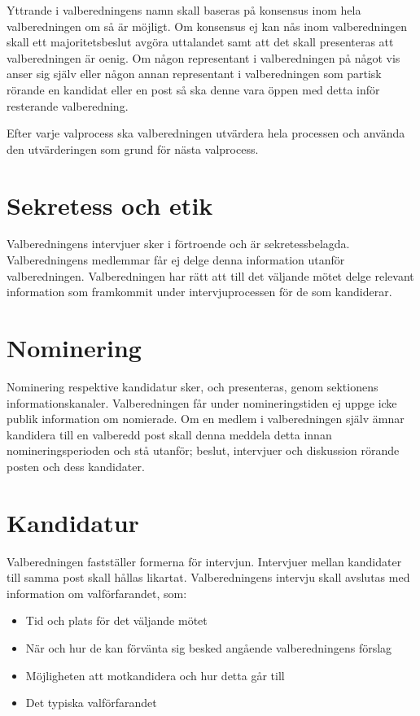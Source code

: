 \documentclass{dsekprotokoll}
\begin{document}
Yttrande i valberedningens namn skall baseras på konsensus inom hela valberedningen om
så är möjligt. Om konsensus ej kan nås inom valberedningen skall ett majoritetsbeslut avgöra
uttalandet samt att det skall presenteras att valberedningen är oenig.
Om någon representant i valberedningen på något vis anser sig själv eller någon annan representant i valberedningen som partisk rörande en kandidat eller en post så ska denne vara
öppen med detta inför resterande valberedning.


Efter varje valprocess ska valberedningen utvärdera hela processen och använda den utvärderingen som grund för nästa valprocess.

\section{Sekretess och etik}
Valberedningens intervjuer sker i förtroende och är sekretessbelagda. Valberedningens medlemmar får ej delge denna information utanför valberedningen. Valberedningen har rätt att till
det väljande mötet delge relevant information som framkommit under intervjuprocessen för
de som kandiderar.

\section{Nominering}
Nominering respektive kandidatur sker, och presenteras, genom sektionens informationskanaler. Valberedningen får under nomineringstiden ej uppge icke publik information om nomierade. Om en medlem i valberedningen själv ämnar kandidera till en valberedd post skall
denna meddela detta innan nomineringsperioden och stå utanför; beslut, intervjuer och diskussion rörande posten och dess kandidater.

\section{Kandidatur}
Valberedningen fastställer formerna för intervjun. Intervjuer mellan kandidater till samma post
skall hållas likartat. Valberedningens intervju skall avslutas med information om valförfarandet, som:
\begin{itemize}
	\item Tid och plats för det väljande mötet
	\item När och hur de kan förvänta sig besked angående valberedningens förslag
	\item Möjligheten att motkandidera och hur detta går till
	\item Det typiska valförfarandet
\end{itemize}
\end{document}
